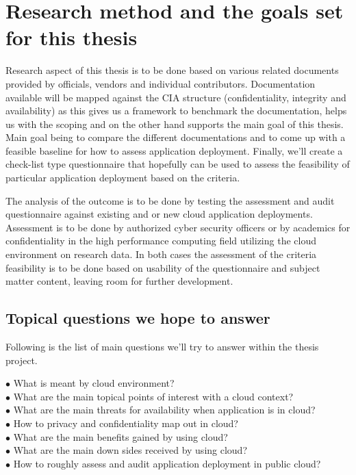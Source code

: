 \documentclass{article}
\begin{document}
\section{Research method and the goals set for this thesis}
Research aspect of this thesis is to be done based on various related documents provided by officials, vendors and individual contributors. Documentation available will be mapped against the CIA structure (confidentiality, integrity and availability) as this gives us a framework to benchmark the documentation, helps us with the scoping and on the other hand supports the main goal of this thesis. Main goal being to compare the different documentations and to come up with a feasible baseline for how to assess application deployment. Finally, we'll create a check-list type questionnaire that hopefully can be used to assess the feasibility of particular application deployment based on the criteria.
\par
The analysis of the outcome is to be done by testing the assessment and audit questionnaire against existing and or new cloud application deployments.
Assessment is to be done by authorized cyber security officers or by academics for confidentiality in the high performance computing field utilizing the cloud environment on research data. In both cases the assessment of the criteria feasibility is to be done based on usability of the questionnaire and subject matter content, leaving room for further development.
\subsection{Topical questions we hope to answer}
Following is the list of main questions we'll try to answer within the thesis project.
\begin{description}
	\item[$\bullet$ What is meant by cloud environment?]
	\item[$\bullet$ What are the main topical points of interest with a cloud context?]
	\item[$\bullet$ What are the main threats for availability when application is in cloud?]
	\item[$\bullet$ How to privacy and confidentiality map out in cloud?]
	\item[$\bullet$ What are the main benefits gained by using cloud?]
	\item[$\bullet$ What are the main down sides received by using cloud?]
	\item[$\bullet$ How to roughly assess and audit application deployment in public cloud?]
\end{description}
\end{document}
